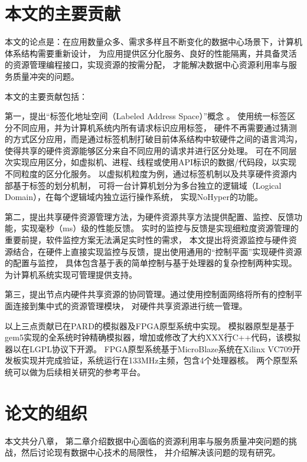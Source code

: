 \section{本文的主要贡献}

本文的论点是：在应用数量众多、需求多样且不断变化的数据中心场景下，计算机体系结构需要重新设计，
为应用提供区分化服务、良好的性能隔离，并具备灵活的资源管理编程接口，实现资源的按需分配，
才能解决数据中心资源利用率与服务质量冲突的问题。

本文的主要贡献包括：

第一，提出“标签化地址空间（Labeled Address Space）”概念 。
使用统一标签区分不同应用，并为计算机系统内所有请求标识应用标签，
硬件不再需要通过猜测的方式区分应用，而是通过标签机制打破目前体系结构中软硬件之间的语言鸿沟，
使得共享的硬件资源能够区分来自不同应用的请求并进行区分处理。
可在不同层次实现应用区分，如虚拟机、进程、线程或使用API标识的数据/代码段，以实现不同粒度的区分化服务。
以虚拟机粒度为例，通过标签机制以及共享硬件资源内部基于标签的划分机制，
可将一台计算机划分为多台独立的逻辑域（Logical Domain），在每个逻辑域内独立运行操作系统，
实现NoHyper\cite{nohype2012}的功能。

第二，提出共享硬件资源管理方法，为硬件资源共享方法提供配置、监控、反馈功能，实现毫秒（ms）级的性能反馈。
实时的监控与反馈是实现细粒度资源管理的重要前提，软件监控方案无法满足实时性的需求，
本文提出将资源监控与硬件资源结合，在硬件上直接实现监控与反馈，提出使用通用的“控制平面”实现硬件资源的配置与监控，
具体包含基于表的简单控制与基于处理器的复杂控制两种实现。为计算机系统实现可管理提供支持。

第三，提出节点内硬件共享资源的协同管理。通过使用控制面网络将所有的控制平面连接到集中式的资源管理模块，
对硬件共享资源进行统一管理。

以上三点贡献已在PARD的模拟器及FPGA原型系统中实现。
模拟器原型是基于gem5实现的全系统时钟精确模拟器，增加或修改了大约XXX行C++代码，该模拟器以在LGPL协议下开源。
FPGA原型系统基于MicroBlaze系统在Xilinx VC709开发板实现并完成验证，系统运行在133MHz主频，包含4个处理器核。
两个原型系统可以做为后续相关研究的参考平台。


\section{论文的组织}

本文共分八章，
第二章介绍数据中心面临的资源利用率与服务质量冲突问题的挑战，然后讨论现有数据中心技术的局限性，
并介绍解决该问题的现有研究。

